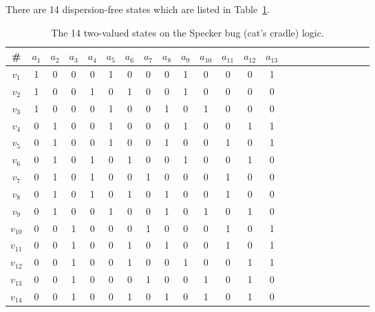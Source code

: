 \documentclass[%
  twocolumn,
 showpacs,
 showkeys,
 preprintnumbers,
 amsmath,amssymb,
 aps,
  pra,
  longbibliography,
 floatfix,
 ]{revtex4-1}
\begin{document}
There are 14 dispersion-free states which are listed in Table~\ref{2001-cesena-t2}.
 \begin{table}%
 \begin{center}
\caption{\label{2001-cesena-t2}  The 14 two-valued states on the Specker bug (cat's cradle) logic.}
 \begin{ruledtabular}
 \begin{tabular}{ccccccccccccccccccccccc}
\# &$a_1$&$a_2$&$a_3$&$a_4$&$a_5$&$a_6$&$a_7$&$a_8$&$a_9$&$a_{10}$&$a_{11}$&$a_{12}$&$a_{13}$\\
\hline
$v_1 $&1&0&0&0&1&0&0&0&1&0&0&0&1         \\
$v_2 $&1&0&0&1&0&1&0&0&1&0&0&0&0          \\
$v_3 $&1&0&0&0&1&0&0&1&0&1&0&0&0         \\
$v_4 $&0&1&0&0&1&0&0&0&1&0&0&1&1         \\
$v_5 $&0&1&0&0&1&0&0&1&0&0&1&0&1         \\
$v_6 $&0&1&0&1&0&1&0&0&1&0&0&1&0          \\
$v_7 $&0&1&0&1&0&0&1&0&0&0&1&0&0          \\
$v_8 $&0&1&0&1&0&1&0&1&0&0&1&0&0          \\
$v_9 $&0&1&0&0&1&0&0&1&0&1&0&1&0         \\
$v_{10}$&0&0&1&0&0&0&1&0&0&0&1&0&1         \\
$v_{11}$&0&0&1&0&0&1&0&1&0&0&1&0&1         \\
$v_{12}$&0&0&1&0&0&1&0&0&1&0&0&1&1         \\
$v_{13}$&0&0&1&0&0&0&1&0&0&1&0&1&0         \\
$v_{14}$&0&0&1&0&0&1&0&1&0&1&0&1&0         \\
 \end{tabular}
 \end{ruledtabular}
 \end{center}
 \end{table}
\end{document}
